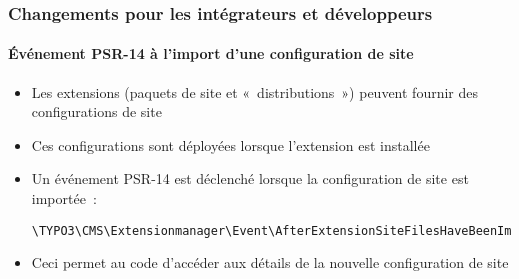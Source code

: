 %

\begin{frame}[fragile]
	\frametitle{Changements pour les intégrateurs et développeurs}
	\framesubtitle{Événement PSR-14 à l'import d'une configuration de site}


	\begin{itemize}
		\item Les extensions (paquets de site et «~distributions~») peuvent fournir des configurations de site
		\item Ces configurations sont déployées lorsque l'extension est installée
		\item Un événement PSR-14 est déclenché lorsque la configuration de site est importée~:
\begin{lstlisting}
\TYPO3\CMS\Extensionmanager\Event\AfterExtensionSiteFilesHaveBeenImportedEvent
\end{lstlisting}
		\item Ceci permet au code d'accéder aux détails de la nouvelle configuration de site
	\end{itemize}
\end{frame}

